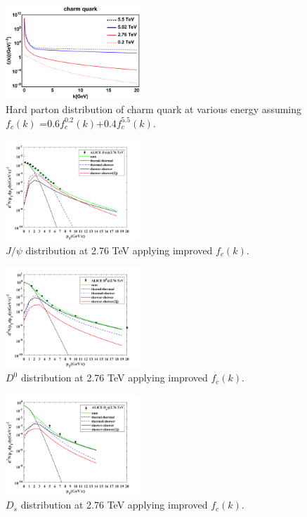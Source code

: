 \documentclass[twocolumn,aps,superscriptaddress,nofootinbib,floatfix]{revtex4}
\begin{document}
\begin{figure}[H]
	\includegraphics[width=0.45\textwidth]{improved fck.png}
	\caption{Hard parton distribution of charm quark at various energy assuming $f_c(k)$ =0.6$f^{0.2}_c(k)$+0.4$f^{5.5}_c(k)$.}
	\label{improved fck}
\end{figure}

\begin{figure}[H]
	\includegraphics[width=0.45\textwidth]{Jpsi_276_4th.png}
	\caption{$J/\psi$ distribution at 2.76 TeV applying improved $f_c(k)$.}
	\label{fig14}
\end{figure}

\begin{figure}[H]
	\includegraphics[width=0.45\textwidth]{D0_276_final.png}
	\caption{$D^0$ distribution at 2.76 TeV applying improved $f_c(k)$.}
	\label{fig15}
\end{figure}

\begin{figure}[H]
	\includegraphics[width=0.45\textwidth]{Ds_276_final.png}
	\caption{$D_s$ distribution at 2.76 TeV applying improved $f_c(k)$.}
	\label{fig16}
\end{figure}
\end{document}
